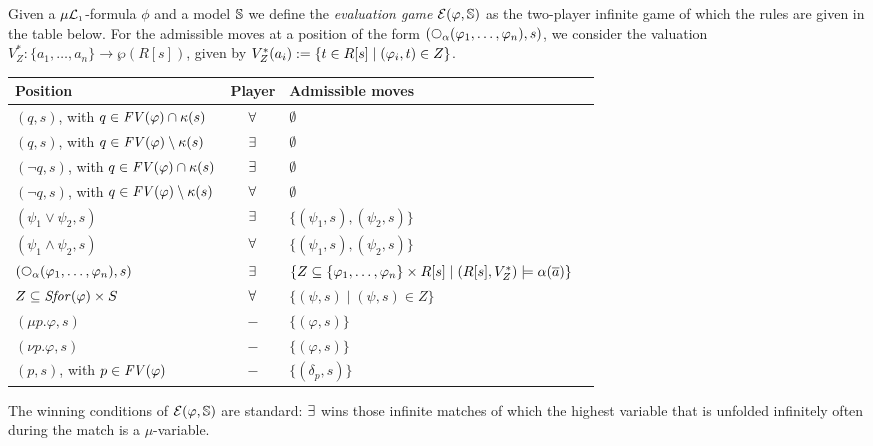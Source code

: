 \begin{definition}
Given a $\mu\mathcal{L}_{\scriptscriptstyle 1}$-formula $\phi$ and a model $\mathbb{S}$ we define the 
\emph{evaluation game} $\mathcal{E}(\varphi,\mathbb{S})$ as the two-player infinite
game of which the rules are given in the table below.
For the admissible moves at a position of the form 
$(\nxt{\al}(\varphi_{1},\ldots,\varphi_{n}),s)$, we consider the valuation 
$V^{*}_{Z}: \{ a_{1}, \ldots, a_{n} \} \to \wp(R[s])$, given by
$V^{*}_{Z}(a_{i}) \mathrel{:=} \{ t \in R[s] \mid (\varphi_{i},t) \in Z \}$.
%
\begin{table}[htb]
\centering
\begin{tabular}{|l|c|l|c|}
\hline
Position & Player & Admissible moves
\\\hline
    $(q,s)$, with $q \in \mathit{FV}(\varphi) \cap \kappa(s)$ 
  & $\forall$ 
  & $\emptyset$
\\  $(q,s)$, with $q \in \mathit{FV}(\varphi) \setminus \kappa(s)$ 
  & $\exists$ & $\emptyset$
\\  $(\lnot q,s)$, with $q \in \mathit{FV}(\varphi) \cap \kappa(s)$ 
  & $\exists$ 
  & $\emptyset$
\\  $(\lnot q,s)$, with $q \in \mathit{FV}(\varphi) \setminus \kappa(s)$ 
  & $\forall$ 
  & $\emptyset$
\\ $(\psi_1 \lor \psi_2,s)$ 
  & $\exists$ 
  & $\{(\psi_1,s),(\psi_2,s) \}$ 
\\  $(\psi_1 \land \psi_2,s)$ 
  & $\forall$ 
  & $\{(\psi_1,s),(\psi_2,s) \}$ 
\\  $(\nxt{\al}(\varphi_{1},\ldots,\varphi_{n}),s)$ 
  & $\exists$ 
  & $\{ Z \subseteq \{ \varphi_{1},\ldots,\varphi_{n} \} \times R[s]
     \mid (R[s],V^{*}_{Z}) \models \alpha(\overline{a}) \}$ 
\\  $Z \subseteq  \mathit{Sfor}(\varphi) \times S$
  & $\forall$
  & $\{ (\psi, s) \mid (\psi,s) \in Z \}$
\\  $(\mu p.\varphi,s)$ & $-$ & $\{(\varphi,s) \}$ 
\\  $(\nu p.\varphi,s)$ & $-$ & $\{(\varphi,s) \}$ 
\\  $(p,s)$, with $p \in \mathit{FV}(\varphi)$ & $-$ & $\{(\delta_p,s) \}$ \\
  \hline
\end{tabular}
\label{tab:EGL}
\end{table}
The winning conditions of $\mathcal{E}(\varphi,\mathbb{S})$ are standard: $\exists$ wins
those infinite matches of which the highest variable that is unfolded infinitely
often during the match is a $\mu$-variable.
\end{definition}

